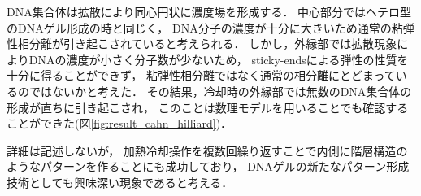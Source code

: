 DNA集合体は拡散により同心円状に濃度場を形成する．
中心部分ではヘテロ型のDNAゲル形成の時と同じく，
DNA分子の濃度が十分に大きいため通常の粘弾性相分離が引き起こされていると考えられる．
しかし，外縁部では拡散現象によりDNAの濃度が小さく分子数が少ないため，
sticky-endsによる弾性の性質を十分に得ることができず，
粘弾性相分離ではなく通常の相分離にとどまっているのではないかと考えた．
その結果，冷却時の外縁部では無数のDNA集合体の形成が直ちに引き起こされ，
このことは数理モデルを用いることでも確認することができた(図\ref{fig:result_cahn_hilliard})．

詳細は記述しないが，
加熱冷却操作を複数回繰り返すことで内側に階層構造のようなパターンを作ることにも成功しており，
DNAゲルの新たなパターン形成技術としても興味深い現象であると考える．
